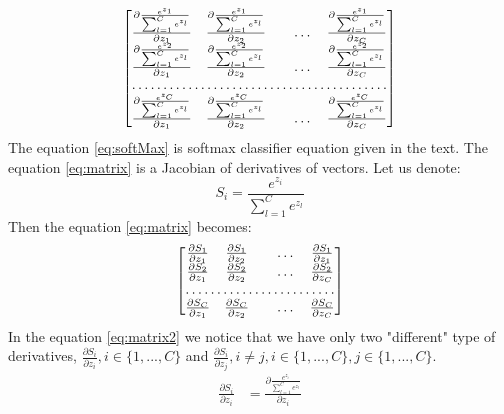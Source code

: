 \documentclass[10pt,a4paper]{article}
\begin{document}
\begin{enumerate}
\begin{align}
\begin{bmatrix}
    \frac{\partial \frac{ e^{z_{1}}}{\sum_{l=1}^{C}e^{z_{l}}}}{\partial z_1}     & 
    \frac{\partial \frac{ e^{z_{1}}}{\sum_{l=1}^{C}e^{z_{l}}}}{\partial z_2}     &  & \dots & \frac{\partial \frac{ e^{z_{1}}}{\sum_{l=1}^{C}e^{z_{l}}}}{\partial z_C} \\
    \frac{\partial \frac{ e^{z_{2}}}{\sum_{l=1}^{C}e^{z_{l}}}}{\partial z_1}     & 
    \frac{\partial \frac{ e^{z_{2}}}{\sum_{l=1}^{C}e^{z_{l}}}}{\partial z_2}     &  & \dots & \frac{\partial \frac{ e^{z_{2}}}{\sum_{l=1}^{C}e^{z_{l}}}}{\partial z_C} \\
    \hdotsfor{5} \\
    \frac{\partial \frac{ e^{z_{C}}}{\sum_{l=1}^{C}e^{z_{l}}}}{\partial z_1}     & 
    \frac{\partial \frac{ e^{z_{C}}}{\sum_{l=1}^{C}e^{z_{l}}}}{\partial z_2}     &  & \dots & \frac{\partial \frac{ e^{z_{C}}}{\sum_{l=1}^{C}e^{z_{l}}}}{\partial z_C} \\
\end{bmatrix} \label{eq:matrix}
\end{align}
The equation \ref{eq:softMax} is softmax classifier equation given in the text. 
The equation \ref{eq:matrix} is a Jacobian of derivatives of vectors. 
Let us denote: $$S_i = \frac{ e^{z_{i}}}{\sum_{l=1}^{C}e^{z_{l}}}$$
Then the equation \ref{eq:matrix} becomes:
\begin{align}
\begin{bmatrix}
    \frac{\partial S_1}{\partial z_1}     & 
    \frac{\partial S_1}{\partial z_2}      &  & \dots & \frac{\partial S_1}{\partial z_1}  \\
    \frac{\partial S_2}{\partial z_1}     & 
    \frac{\partial S_2}{\partial z_2}      &  & \dots & \frac{\partial S_2}{\partial z_C}\\
    \hdotsfor{5} \\
    \frac{\partial S_C}{\partial z_1}     & 
    \frac{\partial S_C}{\partial z_2}      &  & \dots & \frac{\partial S_C}{\partial z_C}\\
\end{bmatrix}\label{eq:matrix2}
\end{align}
In the equation \ref{eq:matrix2} we notice that we have only two "different" type of derivatives, $\frac{\partial S_i}{\partial z_i}, i \in \{ 1, ..., C\}$ and $\frac{\partial S_i}{\partial z_j}, i \ne j, i \in \{ 1, ..., C\}, j \in \{ 1, ..., C\}$.
\begin{align}
\frac{\partial S_i}{\partial z_i} &= 
\frac{\partial \frac{ e^{z_{i}}}{\sum_{l=1}^{C}e^{z_{l}}}}{\partial z_i} \label{eq:partDer}\\

\end{align}
\end{enumerate}
\end{document}

